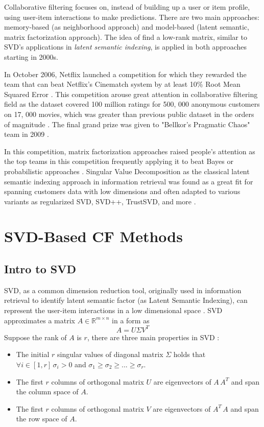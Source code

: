 \documentclass[letter paper, 11pt]{article}
\begin{document}
	
	Collaborative filtering focuses on, instead of building up a user or item profile, using user-item interactions to make predictions. There are two main approaches: memory-based (as neighborhood approach) and model-based (latent semantic, matrix factorization approach). The idea of find a low-rank matrix, similar to SVD's applications in \textit{latent semantic indexing}, is applied in both approaches starting in 2000s.
	
	In October 2006, Netflix launched a competition for which they rewarded the team that can beat Netflix's Cinematch system by at least 10\% Root Mean Squared Error \cite{gower}. This competition arouse great attention in collaborative filtering field as the dataset covered 100 million ratings for 500, 000 anonymous customers on 17, 000 movies, which was greater than previous public dataset in the orders of magnitude \cite{MFinRS}. The final grand prize was given to "Bellkor's Pragmatic Chaos" team in 2009 \cite{gower} \cite{koren}. 
	
	
	In this competition, matrix factorization approaches raised people's attention as the top teams in this competition frequently applying it to beat Bayes or probabilistic approaches \cite{korenFactorization}. Singular Value Decomposition as the classical latent semantic indexing approach in information retrieval was found as a great fit for spanning customers data with low dimensions and often adapted to various variants as regularized SVD, SVD++,  TrustSVD, and more \cite{gower} \cite{SVD++performance} \cite{contextual} \cite{korenFactorization}. 
		
	
	
	\section{SVD-Based CF Methods}
	\subsection{Intro to SVD}
		SVD, as a common dimension reduction tool, originally used in information retrieval to identify latent semantic factor (as Latent Semantic Indexing), can represent the user-item interactions in a low dimensional space \cite{MFinRS} \cite{ApplySVD}. SVD approximates a matrix $A \in \mathbb{R}^{m \times n}$ in a form as 
	\begin{equation}
		A = U \Sigma V^T
	\end{equation}
	Suppose the rank of $A$ is $r$, there are three main properties in SVD\cite{ApplySVD} \cite{gower}:
	\begin{itemize}
		\item 
		The initial $r$ singular values of diagonal matrix $\Sigma$ holds that $\forall i \in [1, r]\,\sigma_i > 0$ and $\sigma_1 \geq \sigma_2 \geq ... \geq \sigma_r$.
		
		\item 
		The first $r$ columns of orthogonal matrix $U$ are eigenvectors of $A\,A^T$ and span the column space of $A$.
		
		\item
		The first $r$ columns of orthogonal matrix $V$ are eigenvectors of $A^T\,A$ and span the row space of $A$.
	\end{itemize}
	
\end{document}
